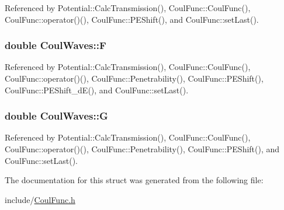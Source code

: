 Referenced by Potential\-::\-Calc\-Transmission(), Coul\-Func\-::\-Coul\-Func(), Coul\-Func\-::operator()(), Coul\-Func\-::\-P\-E\-Shift(), and Coul\-Func\-::set\-Last().

\hypertarget{structCoulWaves_ad04a2d9552d7cfc775f35cd179000553}{
\subsubsection[{F}]{\setlength{\rightskip}{0pt plus 5cm}double Coul\-Waves\-::\-F}}\label{structCoulWaves_ad04a2d9552d7cfc775f35cd179000553}


Referenced by Potential\-::\-Calc\-Transmission(), Coul\-Func\-::\-Coul\-Func(), Coul\-Func\-::operator()(), Coul\-Func\-::\-Penetrability(), Coul\-Func\-::\-P\-E\-Shift(), Coul\-Func\-::\-P\-E\-Shift\-\_\-d\-E(), and Coul\-Func\-::set\-Last().

\hypertarget{structCoulWaves_a6ed564ba02c1d0b75b2453f8129eae48}{
\subsubsection[{G}]{\setlength{\rightskip}{0pt plus 5cm}double Coul\-Waves\-::\-G}}\label{structCoulWaves_a6ed564ba02c1d0b75b2453f8129eae48}


Referenced by Potential\-::\-Calc\-Transmission(), Coul\-Func\-::\-Coul\-Func(), Coul\-Func\-::operator()(), Coul\-Func\-::\-Penetrability(), Coul\-Func\-::\-P\-E\-Shift(), and Coul\-Func\-::set\-Last().



The documentation for this struct was generated from the following file\-:\begin{DoxyCompactItemize}
\item 
include/\hyperlink{CoulFunc_8h}{Coul\-Func.\-h}\end{DoxyCompactItemize}
